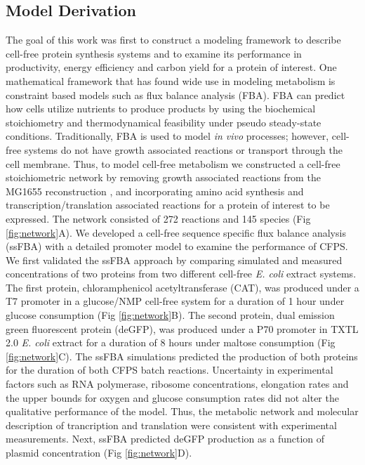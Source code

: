 \documentclass[journal=asbcd6,manuscript=article]{achemso}
\begin{document}
\subsection{Model Derivation}
The goal of this work was first to construct a modeling framework to describe cell-free protein synthesis systems and to examine its performance in productivity, energy efficiency and carbon yield for a protein of interest.
One mathematical framework that has found wide use in modeling metabolism is constraint based models such as flux balance analysis (FBA).
FBA can predict how cells utilize nutrients to produce products by using the biochemical stoichiometry and thermodynamical feasibility under pseudo steady-state conditions.
Traditionally, FBA is used to model \textit{in vivo} processes; however, cell-free systems do not have growth associated reactions or transport through the cell membrane.
Thus, to model cell-free metabolism we constructed a cell-free stoichiometric network by removing growth associated reactions from the MG1655 reconstruction \cite{Feist:2007aa}, and incorporating amino acid synthesis and transcription/translation associated reactions \cite{Allen:2003aa} for a protein of interest to be expressed.
The network consisted of 272 reactions and 145 species (Fig \ref{fig:network}A).
We developed a cell-free sequence specific flux balance analysis (ssFBA) with a detailed promoter model \cite{Moon:2012aa} to examine the performance of CFPS.
We first validated the ssFBA approach by comparing simulated and measured concentrations of two proteins from two different cell-free \textit{E. coli} extract systems.
The first protein, chloramphenicol acetyltransferase (CAT), was produced under a T7 promoter in a glucose/NMP cell-free system \cite{2005_calhoun_BiotechnologyProgress} for a duration of 1 hour under glucose consumption (Fig \ref{fig:network}B).
The second protein, dual emission green fluorescent protein (deGFP), was produced under a P70 promoter in TXTL 2.0 \textit{E. coli} extract for a duration of 8 hours under maltose consumption (Fig \ref{fig:network}C).
The ssFBA simulations predicted the production of both proteins for the duration of both CFPS batch reactions.
Uncertainty in experimental factors such as RNA polymerase, ribosome concentrations, elongation rates and the upper bounds for oxygen and glucose consumption rates did not alter the qualitative performance of the model.
Thus, the metabolic network and molecular description of trancription and translation were consistent with experimental measurements.
Next, ssFBA predicted deGFP production as a function of plasmid concentration (Fig \ref{fig:network}D).
\end{document}
